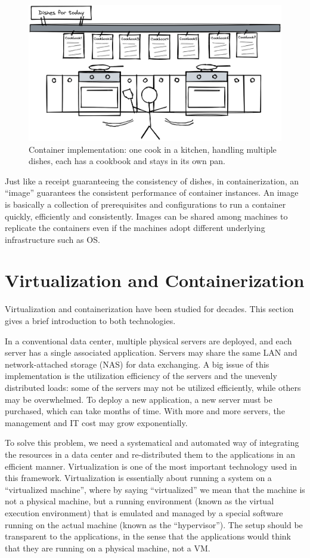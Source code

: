 \begin{figure}
	\centering
	\includegraphics[width=350pt]{chapters/ch-virtualization-and-containerization/figures/multitaskcook.png}
	\caption{Container implementation: one cook in a kitchen, handling multiple dishes, each has a cookbook and stays in its own pan.} \label{ch:vac:fig:multitaskcook}
\end{figure}

Just like a receipt guaranteeing the consistency of dishes, in containerization, an ``image'' guarantees the consistent performance of container instances. An image is basically a collection of prerequisites and configurations to run a container quickly, efficiently and consistently. Images can be shared among machines to replicate the containers even if the machines adopt different underlying infrastructure such as OS.

\section{Virtualization and Containerization}

Virtualization and containerization have been studied for decades. This section gives a brief introduction to both technologies.

In a conventional data center, multiple physical servers are deployed, and each server has a single associated application. Servers may share the same LAN and network-attached storage (NAS) for data exchanging. A big issue of this implementation is the utilization efficiency of the servers and the unevenly distributed loads: some of the servers may not be utilized efficiently, while others may be overwhelmed. To deploy a new application, a new server must be purchased, which can take months of time. With more and more servers, the management and IT cost may grow exponentially.

To solve this problem, we need a systematical and automated way of integrating the resources in a data center and re-distributed them to the applications in an efficient manner. Virtualization is one of the most important technology used in this framework. Virtualization is essentially about running a system on a ``virtualized machine'', where by saying ``virtualized'' we mean that the machine is not a physical machine, but a running environment (known as the virtual execution environment) that is emulated and managed by a special software running on the actual machine (known as the ``hypervisor''). The setup should be transparent to the applications, in the sense that the applications would think that they are running on a physical machine, not a VM.

